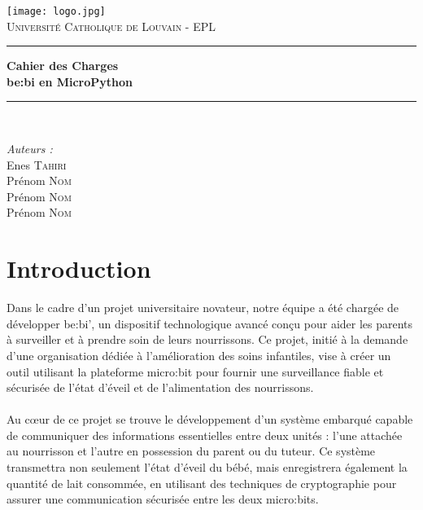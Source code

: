 \documentclass[12pt, letterpaper]{article}
\begin{document}
\begin{center}
    \texttt{[image: logo.jpg]}\\[1cm]
    \textsc{\LARGE Université Catholique de Louvain - EPL}
    \rule{\linewidth}{0.4pt}
    {\huge \bfseries Cahier des Charges\\
    be:bi en MicroPython \\[0.4cm] }
    \rule{\linewidth}{0.4pt}\\[1.5cm]
\end{center}

\begin{flushleft}
    \emph{Auteurs :}\\
        \hspace{1cm}Enes \textsc{Tahiri}\\
        \hspace{1cm}Prénom \textsc{Nom}\\
        \hspace{1cm}Prénom \textsc{Nom}\\
        \hspace{1cm}Prénom \textsc{Nom}
\end{flushleft}

\renewcommand{\contentsname}{Table des matières}
\tableofcontents
\vspace{10cm}

\section*{Introduction}
Dans le cadre d'un projet universitaire novateur, notre équipe a été chargée de développer be:bi’, un dispositif technologique avancé conçu pour aider les parents à surveiller et à prendre soin de leurs nourrissons. Ce projet, initié à la demande d'une organisation dédiée à l'amélioration des soins infantiles, vise à créer un outil utilisant la plateforme micro:bit pour fournir une surveillance fiable et sécurisée de l'état d'éveil et de l'alimentation des nourrissons.\\\\
Au cœur de ce projet se trouve le développement d'un système embarqué capable de communiquer des informations essentielles entre deux unités : l'une attachée au nourrisson et l'autre en possession du parent ou du tuteur. Ce système transmettra non seulement l'état d'éveil du bébé, mais enregistrera également la quantité de lait consommée, en utilisant des techniques de cryptographie pour assurer une communication sécurisée entre les deux micro:bits.
\end{document}
